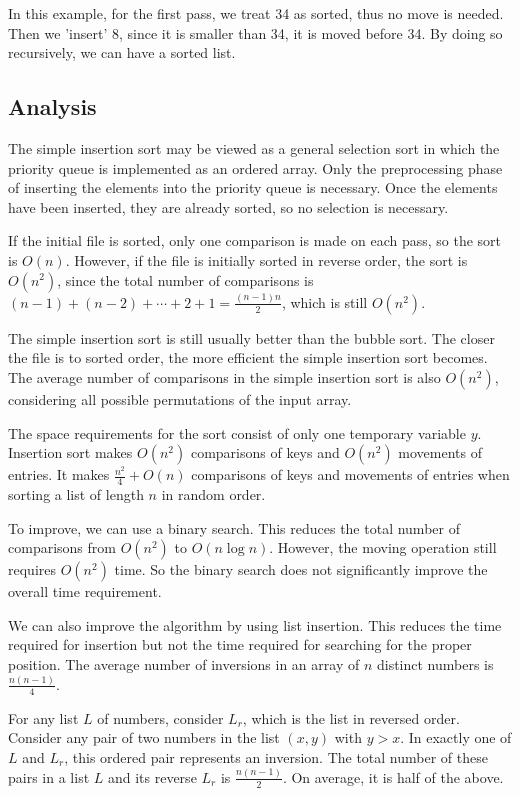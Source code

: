 In this example, for the first pass, we treat 34 as sorted, thus no move is needed. Then we 'insert' 8, since it is smaller than 34, it is moved before 34. By doing so recursively, we can have a sorted list. 

\subsection{Analysis}
The simple insertion sort may be viewed as a general selection sort in which the priority queue is implemented as an ordered array. Only the preprocessing phase of inserting the elements into the priority queue is necessary. Once the elements have been inserted, they are already sorted, so no selection is necessary.

If the initial file is sorted, only one comparison is made on each pass, so the sort is \(O(n)\). However, if the file is initially sorted in reverse order, the sort is \(O(n^2)\), since the total number of comparisons is \((n - 1) + (n - 2) + \cdots + 2 + 1 = \frac{(n - 1)n}{2}\), which is still \(O(n^2)\).

The simple insertion sort is still usually better than the bubble sort. The closer the file is to sorted order, the more efficient the simple insertion sort becomes. The average number of comparisons in the simple insertion sort is also \(O(n^2)\), considering all possible permutations of the input array.

The space requirements for the sort consist of only one temporary variable \( y \). Insertion sort makes \( O(n^2) \) comparisons of keys and \( O(n^2) \) movements of entries. It makes \(\frac{n^2}{4} + O(n)\) comparisons of keys and movements of entries when sorting a list of length \( n \) in random order. 

To improve, we can use a binary search. This reduces the total number of comparisons from \( O(n^2) \) to \( O(n \log n) \). However, the moving operation still requires \( O(n^2) \) time. So the binary search does not significantly improve the overall time requirement. 

We can also improve the algorithm by using list insertion. This reduces the time required for insertion but not the time required for searching for the proper position. The average number of inversions in an array of \( n \) distinct numbers is \( \frac{n(n-1)}{4} \). 

For any list \( L \) of numbers, consider \( L_r \), which is the list in reversed order. Consider any pair of two numbers in the list \( (x, y) \) with \( y > x \). In exactly one of \( L \) and \( L_r \), this ordered pair represents an inversion. The total number of these pairs in a list \( L \) and its reverse \( L_r \) is \( \frac{n(n-1)}{2} \). On average, it is half of the above. 

